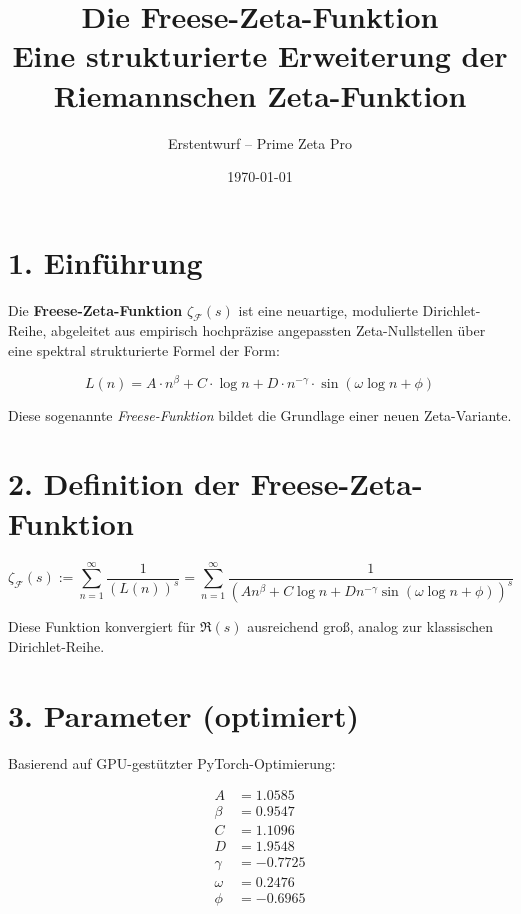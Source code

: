 \documentclass[12pt]{article}
\title{Die Freese-Zeta-Funktion \\[1ex] \large Eine strukturierte Erweiterung der Riemannschen Zeta-Funktion}
\author{Erstentwurf – Prime Zeta Pro}
\date{\today}
\begin{document}
\maketitle

\section*{1. Einführung}
Die \textbf{Freese-Zeta-Funktion} $\zeta_{\mathcal{F}}(s)$ ist eine neuartige, modulierte Dirichlet-Reihe, abgeleitet aus empirisch hochpräzise angepassten Zeta-Nullstellen über eine spektral strukturierte Formel der Form:

\begin{equation}
L(n) = A \cdot n^{\beta} + C \cdot \log n + D \cdot n^{-\gamma} \cdot \sin(\omega \log n + \phi)
\label{eq:freese_function}
\end{equation}

Diese sogenannte \textit{Freese-Funktion} bildet die Grundlage einer neuen Zeta-Variante.

\vspace{1em}

\section*{2. Definition der Freese-Zeta-Funktion}
\begin{equation}
\zeta_{\mathcal{F}}(s) := \sum_{n=1}^{\infty} \frac{1}{\left( L(n) \right)^s}
= \sum_{n=1}^{\infty} \frac{1}{\left( A n^{\beta} + C \log n + D n^{-\gamma} \sin(\omega \log n + \phi) \right)^s}
\end{equation}

Diese Funktion konvergiert für $\Re(s)$ ausreichend groß, analog zur klassischen Dirichlet-Reihe.

\vspace{1em}

\section*{3. Parameter (optimiert)}
Basierend auf GPU-gestützter PyTorch-Optimierung:

\begin{align*}
A &= 1.0585 \\
\beta &= 0.9547 \\
C &= 1.1096 \\
D &= 1.9548 \\
\gamma &= -0.7725 \\
\omega &= 0.2476 \\
\phi &= -0.6965
\end{align*}
\end{document}
